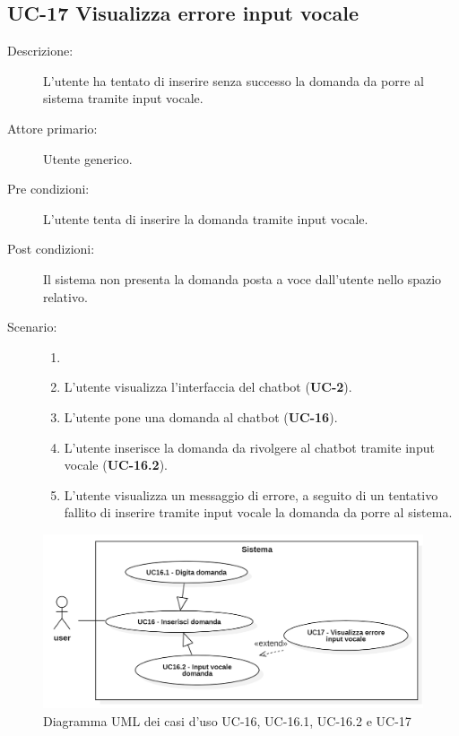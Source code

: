 \subsection{UC-17 Visualizza errore input vocale}
\begin{description}
    \item[Descrizione:] L'utente ha tentato di inserire senza successo la domanda da porre al sistema tramite input vocale.
    \item[Attore primario:] Utente generico.
    \item[Pre condizioni:] L'utente tenta di inserire la domanda tramite input vocale.
    \item[Post condizioni:] Il sistema non presenta la domanda posta a voce dall'utente nello spazio relativo.
    \item[Scenario:] 
    \begin{enumerate}
        \item[] 
        \item L’utente visualizza l'interfaccia del chatbot (\textbf{UC-2}).
        \item L’utente pone una domanda al chatbot (\textbf{UC-16}).
        \item L'utente inserisce la domanda da rivolgere al chatbot tramite input vocale (\textbf{UC-16.2}).
        \item L'utente visualizza un messaggio di errore, a seguito di un tentativo fallito di inserire tramite input vocale la domanda da porre al sistema.
    \end{enumerate}
\end{description}

\begin{figure}[H]
    \centering
    \includegraphics[width=\linewidth]{UC16-17.PNG}
    \caption{Diagramma UML dei casi d'uso UC-16, UC-16.1, UC-16.2 e UC-17}
    \label{fig:UC16-17}
\end{figure}

